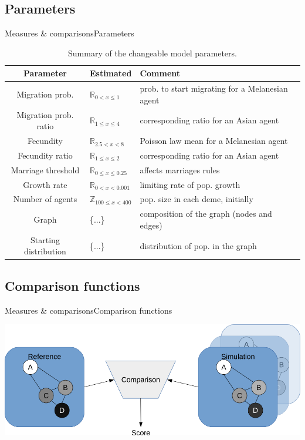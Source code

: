 \documentclass[10pt,aspectratio=43]{beamer}
\begin{document}
\subsection{Parameters}
\begin{frame}{Measures \& comparisons}{Parameters}
\begin{table}[H]
	\hspace*{-1.05cm}
	\begin{tabular}{c|l|l}
 		Parameter & Estimated & Comment \\ \hline \hline
        Migration prob. & $\mathbb{R}_{0 < x \leq 1}$ & prob. to start migrating for a Melanesian agent \\ \hline
        Migration prob. ratio & $\mathbb{R}_{1 \leq x \leq 4}$ & corresponding ratio for an Asian agent \\ \hline
        Fecundity & $\mathbb{R}_{2.5 < x < 8}$ & Poisson law mean for a Melanesian agent \\ \hline
        Fecundity ratio & $\mathbb{R}_{1 \leq x \leq 2}$ & corresponding ratio for an Asian agent \\ \hline
        Marriage threshold & $\mathbb{R}_{0 \leq x \leq 0.25}$ & affects marriages rules \\ \hline
        Growth rate & $\mathbb{R}_{0 < x < 0.001}$ & limiting rate of pop. growth \\ \hline
        Number of agents & $\mathbb{Z}_{100 \leq x < 400}$ & pop. size in each deme, initially \\ \hline
        Graph & \{...\} & composition of the graph (nodes and edges) \\ \hline
        Starting distribution & \{...\} & distribution of pop. in the graph
	\end{tabular}
	\caption{Summary of the changeable model parameters.}
\end{table}
\end{frame}

\subsection{Comparison functions}
\begin{frame}{Measures \& comparisons}{Comparison functions}
\begin{center}
  \includegraphics[width=1\textwidth]{../data/comparison-general.png}
\end{center}
\end{frame}
\end{document}
